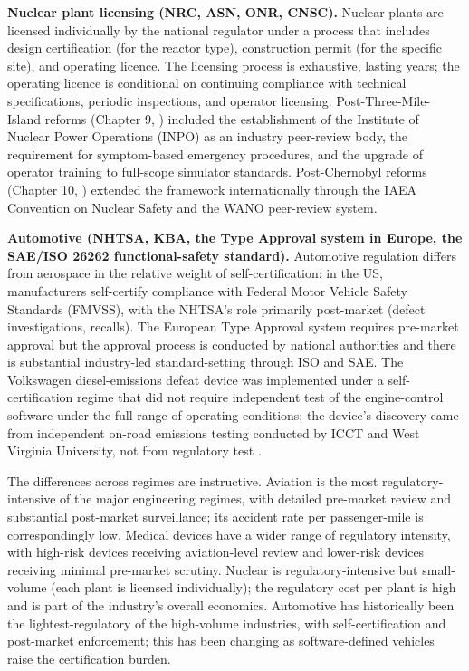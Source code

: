 \textbf{Nuclear plant licensing (NRC, ASN, ONR, CNSC).} Nuclear plants are licensed individually by the national regulator under a process that includes design certification (for the reactor type), construction permit (for the specific site), and operating licence. The licensing process is exhaustive, lasting years; the operating licence is conditional on continuing compliance with technical specifications, periodic inspections, and operator licensing. Post-Three-Mile-Island reforms (Chapter 9, \cite{acc:kemeny-tmi-1979}) included the establishment of the Institute of Nuclear Power Operations (INPO) as an industry peer-review body, the requirement for symptom-based emergency procedures, and the upgrade of operator training to full-scope simulator standards. Post-Chernobyl reforms (Chapter 10, \cite{acc:iaea-insag7-1992}) extended the framework internationally through the IAEA Convention on Nuclear Safety and the WANO peer-review system.

\textbf{Automotive (NHTSA, KBA, the Type Approval system in Europe, the SAE/ISO 26262 functional-safety standard).} Automotive regulation differs from aerospace in the relative weight of self-certification: in the US, manufacturers self-certify compliance with Federal Motor Vehicle Safety Standards (FMVSS), with the NHTSA's role primarily post-market (defect investigations, recalls). The European Type Approval system requires pre-market approval but the approval process is conducted by national authorities and there is substantial industry-led standard-setting through ISO and SAE. The Volkswagen diesel-emissions defeat device was implemented under a self-certification regime that did not require independent test of the engine-control software under the full range of operating conditions; the device's discovery came from independent on-road emissions testing conducted by ICCT and West Virginia University, not from regulatory test \cite{acc:epa-vw-nov-2015}.

The differences across regimes are instructive. Aviation is the most regulatory-intensive of the major engineering regimes, with detailed pre-market review and substantial post-market surveillance; its accident rate per passenger-mile is correspondingly low. Medical devices have a wider range of regulatory intensity, with high-risk devices receiving aviation-level review and lower-risk devices receiving minimal pre-market scrutiny. Nuclear is regulatory-intensive but small-volume (each plant is licensed individually); the regulatory cost per plant is high and is part of the industry's overall economics. Automotive has historically been the lightest-regulatory of the high-volume industries, with self-certification and post-market enforcement; this has been changing as software-defined vehicles raise the certification burden.

